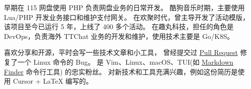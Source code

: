 
\begin{cvparagraph}

早期在 115 网盘使用 PHP 负责网盘业务的日常开发。
酷狗音乐时期，主要使用 Lua/PHP 开发业务接口和维护支付网关。
在欢聚时代，曾主导开发了活动模版，该项目至今已运行 5 年，上线了 400 多个活动。
在趣丸科技，担任的角色是 DevOps，负责海外 TTChat 业务的开发和维护，使用技术主要是 Go/K8S。

喜欢分享和开源，平时会写一些技术文章和小工具，
曾经提交过 \href{https://github.com/shadow-maint/shadow/pull/1086}{\uline{Pull Request}} 修复了一个 Linux 命令的 Bug。
是 Vim、Linux、macOS、TUI(如 \href{https://github.com/kugarocks/markdown-finder}{\uline{Markdown Finder}} 命令行工具) 的忠实粉丝。
对新技术和工具充满兴趣，例如这份简历是使用 Cursor + LaTeX 编写的。
\end{cvparagraph}
